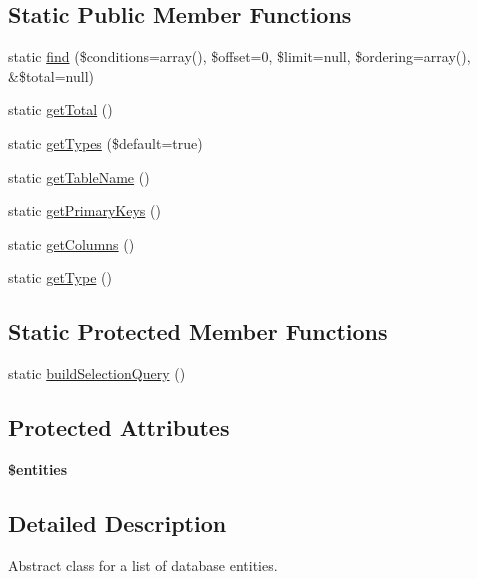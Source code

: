 \subsection*{Static Public Member Functions}
\begin{DoxyCompactItemize}
\item 
static \hyperlink{classEntityList_ab4cbc27b6e608cddff7c8e7b7e852bbc}{find} (\$conditions=array(), \$offset=0, \$limit=null, \$ordering=array(), \&\$total=null)
\item 
static \hyperlink{classEntityList_a949d4cec1f470a75357a79027266ff7b}{getTotal} ()
\item 
static \hyperlink{classEntityList_a6d880dc516f006975a349b1790d7020f}{getTypes} (\$default=true)
\item 
static \hyperlink{classEntityList_a26d1917550bff1083b311ff888914f87}{getTableName} ()
\item 
static \hyperlink{classEntityList_adfac42710bce4db5b10cbd3ae4ec7714}{getPrimaryKeys} ()
\item 
static \hyperlink{classEntityList_a3a33fe428c0ff87a7555b5082aa8925a}{getColumns} ()
\item 
static \hyperlink{classEntityList_a2cdb7c626516c7aeac73f412d5cd09ce}{getType} ()
\end{DoxyCompactItemize}
\subsection*{Static Protected Member Functions}
\begin{DoxyCompactItemize}
\item 
static \hyperlink{classEntityList_a9780f5f54e8f05f04e152685aa6a443d}{buildSelectionQuery} ()
\end{DoxyCompactItemize}
\subsection*{Protected Attributes}
\begin{DoxyCompactItemize}
\item 
\hypertarget{classEntityList_a129d9f87af50328dab85a05b3f67fc17}{
{\bfseries \$entities}}
\label{classEntityList_a129d9f87af50328dab85a05b3f67fc17}

\end{DoxyCompactItemize}


\subsection{Detailed Description}
Abstract class for a list of database entities. 

